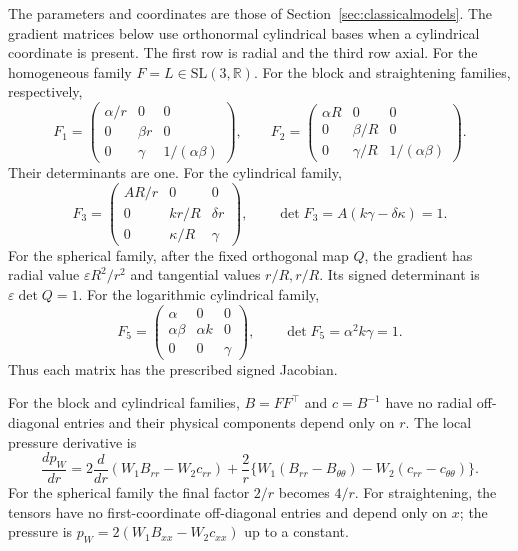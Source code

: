 The parameters and coordinates are those of
Section~\ref{sec:classicalmodels}. The gradient matrices below
use orthonormal cylindrical bases when a cylindrical coordinate is
present. The first row is radial and the third row axial.
For the homogeneous family $F=L\in\mathrm{SL}(3,\mathbb R)$.
For the block and straightening families, respectively,
\[
 F_1=\begin{pmatrix}\alpha/r&0&0\\0&\beta r&0\\0&\gamma&1/(\alpha\beta)\end{pmatrix},
 \qquad
 F_2=\begin{pmatrix}\alpha R&0&0\\0&\beta/R&0\\0&\gamma/R&1/(\alpha\beta)\end{pmatrix}.
\]
Their determinants are one. For the cylindrical family,
\[
 F_3=\begin{pmatrix}
 AR/r&0&0\\0&kr/R&\delta r\\0&\kappa/R&\gamma
 \end{pmatrix},\qquad
 \det F_3=A(k\gamma-\delta\kappa)=1.
\]
For the spherical family, after the fixed orthogonal map $Q$,
the gradient has radial value $\varepsilon R^2/r^2$ and tangential
values $r/R,r/R$. Its signed determinant is
$\varepsilon\det Q=1$. For the logarithmic cylindrical family,
\[
 F_5=\begin{pmatrix}\alpha&0&0\\\alpha\beta&\alpha k&0\\0&0&\gamma\end{pmatrix},
 \qquad\det F_5=\alpha^2k\gamma=1.
\]
Thus each matrix has the prescribed signed Jacobian.

For the block and cylindrical families, $B=FF^{\top}$ and
$c=B^{-1}$ have no radial off-diagonal entries and their physical
components depend only on $r$. The local pressure derivative is
\begin{equation}\label{supp:radial-pressure}
 \frac{dp_W}{dr}
 =2\frac{d}{dr}(W_1B_{rr}-W_2c_{rr})
  +\frac2r\{W_1(B_{rr}-B_{\theta\theta})
                       -W_2(c_{rr}-c_{\theta\theta})\}.
\end{equation}
For the spherical family the final factor $2/r$ becomes $4/r$.
For straightening, the tensors have no first-coordinate
off-diagonal entries and depend only on $x$; the pressure is
$p_W=2(W_1B_{xx}-W_2c_{xx})$ up to a constant.


